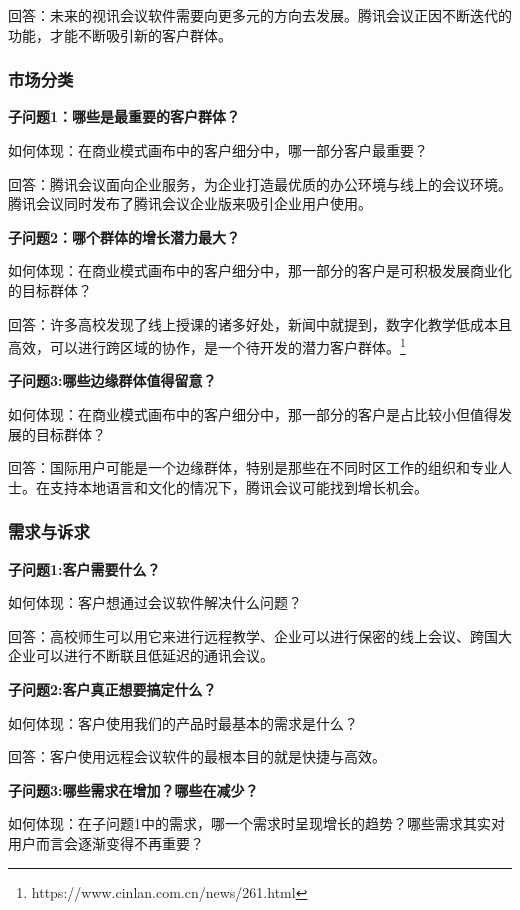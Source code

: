 \documentclass[a4paper,12pt]{article}
\begin{document}
    回答：未来的视讯会议软件需要向更多元的方向去发展。腾讯会议正因不断迭代的功能，才能不断吸引新的客户群体。
    




    
    \subsubsection{市场分类}
    \textbf{子问题1：哪些是最重要的客户群体？}

    如何体现：在商业模式画布中的客户细分中，哪一部分客户最重要？

    回答：腾讯会议面向企业服务，为企业打造最优质的办公环境与线上的会议环境。腾讯会议同时发布了腾讯会议企业版来吸引企业用户使用。
    
    \textbf{子问题2：哪个群体的增长潜力最大？}

    如何体现：在商业模式画布中的客户细分中，那一部分的客户是可积极发展商业化的目标群体？

    回答：许多高校发现了线上授课的诸多好处，新闻中就提到，数字化教学低成本且高效，可以进行跨区域的协作，是一个待开发的潜力客户群体。\footnote{https://www.cinlan.com.cn/news/261.html}



    \textbf{子问题3:哪些边缘群体值得留意？}

    如何体现：在商业模式画布中的客户细分中，那一部分的客户是占比较小但值得发展的目标群体？

    回答：国际用户可能是一个边缘群体，特别是那些在不同时区工作的组织和专业人士。在支持本地语言和文化的情况下，腾讯会议可能找到增长机会。
    
    \subsubsection{需求与诉求}
    \textbf{子问题1:客户需要什么？}

    如何体现：客户想通过会议软件解决什么问题？

    回答：高校师生可以用它来进行远程教学、企业可以进行保密的线上会议、跨国大企业可以进行不断联且低延迟的通讯会议。
    
    \textbf{子问题2:客户真正想要搞定什么？}

    如何体现：客户使用我们的产品时最基本的需求是什么？

    回答：客户使用远程会议软件的最根本目的就是快捷与高效。

    \textbf{子问题3:哪些需求在增加？哪些在减少？}

    如何体现：在子问题1中的需求，哪一个需求时呈现增长的趋势？哪些需求其实对用户而言会逐渐变得不再重要？
\end{document}
